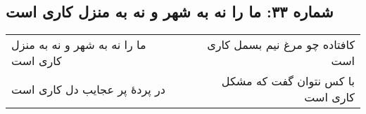 \begin{center}
\section*{شماره ۳۳: ما را نه به شهر و نه به منزل کاری است}
\label{sec:033}
\begin{longtable}{l p{0.5cm} r}
ما را نه به شهر و نه به منزل کاری است
&&
کافتاده چو مرغ نیم بسمل کاری است
\\
در پردهٔ پر عجایب دل کاری است
&&
با کس نتوان گفت که مشکل کاری است
\\
\end{longtable}
\end{center}
